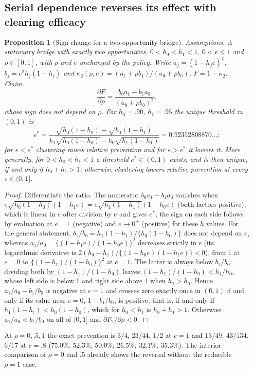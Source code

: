 \documentclass[11pt]{article}
\newtheorem{proposition}{Proposition}
\begin{document}
\subsection{Serial dependence reverses its effect with clearing efficacy}\label{sec:s-proof-interaction}
\begin{proposition}[Sign change for a two-opportunity bridge]\label{prop:interaction}
\emph{Assumptions.} A stationary bridge with exactly two opportunities,
$0<h_0<h_1<1$, $0<e\le1$ and $\rho\in[0,1]$, with $\rho$ and $e$ unchanged by the policy.
Write $a_j=(1-h_je)^2$, $b_j=e^2h_j(1-h_j)$ and $\kappa_2(\rho,e)=(a_1+\rho b_1)/(a_0+\rho
b_0)$, $F=1-\kappa_2$. \emph{Claim.}
\begin{equation}
\frac{\partial F}{\partial\rho}=\frac{b_0a_1-b_1a_0}{(a_0+\rho b_0)^2},
\end{equation}
whose sign does not depend on $\rho$. For $h_0=.90$, $h_1=.95$ the unique
threshold in $(0,1)$ is
\begin{equation}
e^*=\frac{\sqrt{h_0(1-h_0)}-\sqrt{h_1(1-h_1)}}{h_1\sqrt{h_0(1-h_0)}-h_0\sqrt{h_1(1-h_1)}}
=0.92352808870\ldots;
\end{equation}
for $e<e^*$ clustering raises relative prevention and for $e>e^*$ it lowers it.
More generally, for $0<h_0<h_1<1$ a threshold $e^*\in(0,1)$ exists, and is then
unique, if and only if $h_0+h_1>1$; otherwise clustering lowers relative
prevention at every $e\in(0,1]$.
\end{proposition}
\begin{proof}
Differentiate the ratio. The numerator $b_0a_1-b_1a_0$ vanishes when
$e\sqrt{h_0(1-h_0)}(1-h_1e)=e\sqrt{h_1(1-h_1)}(1-h_0e)$ (both factors positive),
which is linear in $e$ after division by $e$ and gives $e^*$; the sign on each
side follows by evaluation at $e=1$ (negative) and $e\to0^+$ (positive) for these
$h$ values. For the general statement, $b_1/b_0=h_1(1-h_1)/\{h_0(1-h_0)\}$ does not
depend on $e$, whereas $a_1/a_0=\{(1-h_1e)/(1-h_0e)\}^2$ decreases strictly in $e$
(its logarithmic derivative is $2(h_0-h_1)/\{(1-h_0e)(1-h_1e)\}<0$), from 1 at $e=0$
to $\{(1-h_1)/(1-h_0)\}^2$ at $e=1$. The latter is always below $b_1/b_0$:
dividing both by $(1-h_1)/(1-h_0)$ leaves $(1-h_1)/(1-h_0)<h_1/h_0$, whose left
side is below 1 and right side above 1 when $h_1>h_0$. Hence $a_1/a_0-b_1/b_0$ is negative at $e=1$ and crosses zero
exactly once in $(0,1)$ if and only if its value near $e=0$, $1-b_1/b_0$, is
positive, that is, if and only if $h_1(1-h_1)<h_0(1-h_0)$, which for $h_0<h_1$ is
$h_0+h_1>1$. Otherwise $a_1/a_0<b_1/b_0$ on all of $(0,1]$ and
$\partial F_2/\partial\rho<0$.
\end{proof}
At $\rho=0,.5,1$ the exact prevention is $3/4$, $23/44$, $1/2$ at $e=1$ and
$13/49$, $43/134$, $6/17$ at $e=.8$ (75.0\%, 52.3\%, 50.0\%; 26.5\%, 32.1\%,
35.3\%). The interior comparison of $\rho=0$ and .5 already shows the reversal
without the reducible $\rho=1$ case.
\end{document}
